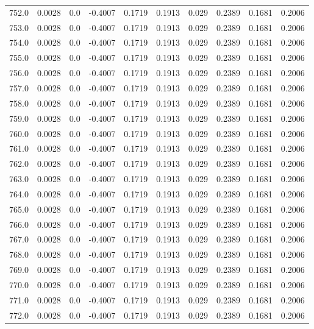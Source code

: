 \begin{longtable}{lrrrrrrrrr}
752.0 & 0.0028 & 0.0 & -0.4007 & 0.1719 & 0.1913 & 0.029 & 0.2389 & 0.1681 & 0.2006 \\
753.0 & 0.0028 & 0.0 & -0.4007 & 0.1719 & 0.1913 & 0.029 & 0.2389 & 0.1681 & 0.2006 \\
754.0 & 0.0028 & 0.0 & -0.4007 & 0.1719 & 0.1913 & 0.029 & 0.2389 & 0.1681 & 0.2006 \\
755.0 & 0.0028 & 0.0 & -0.4007 & 0.1719 & 0.1913 & 0.029 & 0.2389 & 0.1681 & 0.2006 \\
756.0 & 0.0028 & 0.0 & -0.4007 & 0.1719 & 0.1913 & 0.029 & 0.2389 & 0.1681 & 0.2006 \\
757.0 & 0.0028 & 0.0 & -0.4007 & 0.1719 & 0.1913 & 0.029 & 0.2389 & 0.1681 & 0.2006 \\
758.0 & 0.0028 & 0.0 & -0.4007 & 0.1719 & 0.1913 & 0.029 & 0.2389 & 0.1681 & 0.2006 \\
759.0 & 0.0028 & 0.0 & -0.4007 & 0.1719 & 0.1913 & 0.029 & 0.2389 & 0.1681 & 0.2006 \\
760.0 & 0.0028 & 0.0 & -0.4007 & 0.1719 & 0.1913 & 0.029 & 0.2389 & 0.1681 & 0.2006 \\
761.0 & 0.0028 & 0.0 & -0.4007 & 0.1719 & 0.1913 & 0.029 & 0.2389 & 0.1681 & 0.2006 \\
762.0 & 0.0028 & 0.0 & -0.4007 & 0.1719 & 0.1913 & 0.029 & 0.2389 & 0.1681 & 0.2006 \\
763.0 & 0.0028 & 0.0 & -0.4007 & 0.1719 & 0.1913 & 0.029 & 0.2389 & 0.1681 & 0.2006 \\
764.0 & 0.0028 & 0.0 & -0.4007 & 0.1719 & 0.1913 & 0.029 & 0.2389 & 0.1681 & 0.2006 \\
765.0 & 0.0028 & 0.0 & -0.4007 & 0.1719 & 0.1913 & 0.029 & 0.2389 & 0.1681 & 0.2006 \\
766.0 & 0.0028 & 0.0 & -0.4007 & 0.1719 & 0.1913 & 0.029 & 0.2389 & 0.1681 & 0.2006 \\
767.0 & 0.0028 & 0.0 & -0.4007 & 0.1719 & 0.1913 & 0.029 & 0.2389 & 0.1681 & 0.2006 \\
768.0 & 0.0028 & 0.0 & -0.4007 & 0.1719 & 0.1913 & 0.029 & 0.2389 & 0.1681 & 0.2006 \\
769.0 & 0.0028 & 0.0 & -0.4007 & 0.1719 & 0.1913 & 0.029 & 0.2389 & 0.1681 & 0.2006 \\
770.0 & 0.0028 & 0.0 & -0.4007 & 0.1719 & 0.1913 & 0.029 & 0.2389 & 0.1681 & 0.2006 \\
771.0 & 0.0028 & 0.0 & -0.4007 & 0.1719 & 0.1913 & 0.029 & 0.2389 & 0.1681 & 0.2006 \\
772.0 & 0.0028 & 0.0 & -0.4007 & 0.1719 & 0.1913 & 0.029 & 0.2389 & 0.1681 & 0.2006 \\

\end{longtable}
